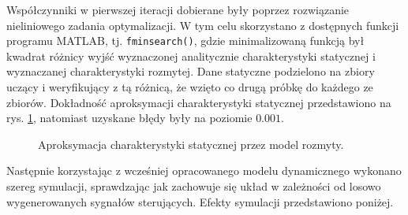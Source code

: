 \documentclass[a4paper,titlepage,11pt,floatssmall]{mwrep}
\begin{document}
Współczynniki w pierwszej iteracji dobierane były poprzez rozwiązanie nieliniowego zadania optymalizacji. W tym celu skorzystano z dostępnych funkcji programu MATLAB, tj. \verb+fminsearch()+, gdzie minimalizowaną funkcją był kwadrat różnicy wyjść wyznaczonej analitycznie charakterystyki statycznej i wyznaczanej charakterystyki rozmytej. Dane statyczne podzielono na zbiory uczący i weryfikujący z tą różnicą, że wzięto co drugą próbkę do każdego ze zbiorów. Dokładność aproksymacji charakterystyki statycznej przedstawiono na rys. \ref{static_hamm}, natomiast uzyskane błędy były na poziomie $\num{0.001}$. 

\begin{figure}[h!]
\centering
{}
\hfill
{}
\caption{Aproksymacja charakterystyki statycznej przez model rozmyty.}
\label{static_hamm}
\end{figure}

Następnie korzystając z wcześniej opracowanego modelu dynamicznego wykonano szereg symulacji, sprawdzając jak zachowuje się układ w zależności od losowo wygenerowanych sygnałów sterujących. Efekty symulacji przedstawiono poniżej.

\end{document}
